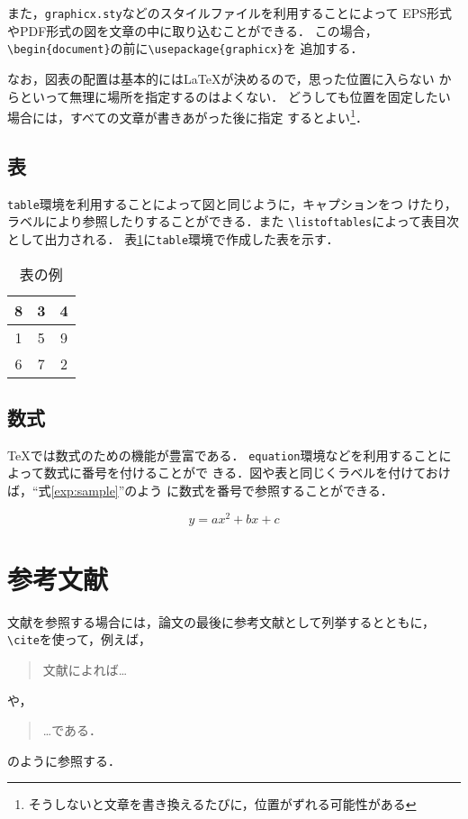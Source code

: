 \documentclass[11pt,dvipdfmx]{jreport}
\begin{document}
また，{\tt graphicx.sty}などのスタイルファイルを利用することによって
EPS形式やPDF形式の図を文章の中に取り込むことができる．
この場合，\verb|\begin{document}|の前に\verb|\usepackage{graphicx}|を
追加する．

なお，図表の配置は基本的には\LaTeX{}が決めるので，思った位置に入らない
からといって無理に場所を指定するのはよくない．
どうしても位置を固定したい場合には，すべての文章が書きあがった後に指定
するとよい\footnote{そうしないと文章を書き換えるたびに，位置がずれる可能性がある}．

\section{表}

{\tt table}環境を利用することによって図と同じように，キャプションをつ
けたり，ラベルにより参照したりすることができる．また
\verb|\listoftables|によって表目次として出力される．
表\ref{tab:sample}に{\tt table}環境で作成した表を示す．

\begin{table}
  \caption{表の例}
  \label{tab:sample}
  \centering
  \begin{tabular}{|c|c|c|}
    \hline
    8 & 3 & 4\\
    \hline
    1 & 5 & 9 \\
    \hline
    6 & 7 & 2 \\
    \hline
  \end{tabular}
\end{table}

\section{数式}

\TeX では数式のための機能が豊富である．
{\tt equation}環境などを利用することによって数式に番号を付けることがで
きる．図や表と同じくラベルを付けておけば，``式\ref{exp:sample}''のよう
に数式を番号で参照することができる．

\begin{equation}
  y = ax^2 + bx + c \label{exp:sample}
\end{equation}

\chapter{参考文献}

文献を参照する場合には，論文の最後に参考文献として列挙するとともに，
\verb|\cite|を使って，例えば，
\begin{quote}
  文献\cite{latex}によれば…
\end{quote}
や，
\begin{quote}
  …である\cite{latex2e}．
\end{quote}
のように参照する．
\end{document}
